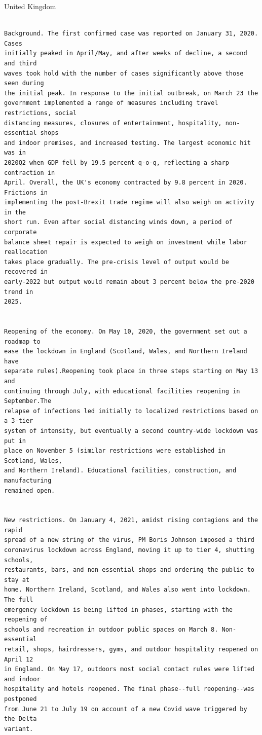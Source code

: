 \documentclass[10pt, letterpaper]{article}
\begin{document}
\begin{spacing}{1.4}
United Kingdom
\begin{scriptsize}
\begin{spacing}{.85}
\begin{verbatim}

Background. The first confirmed case was reported on January 31, 2020. Cases
initially peaked in April/May, and after weeks of decline, a second and third
waves took hold with the number of cases significantly above those seen during
the initial peak. In response to the initial outbreak, on March 23 the
government implemented a range of measures including travel restrictions, social
distancing measures, closures of entertainment, hospitality, non-essential shops
and indoor premises, and increased testing. The largest economic hit was in
2020Q2 when GDP fell by 19.5 percent q-o-q, reflecting a sharp contraction in
April. Overall, the UK's economy contracted by 9.8 percent in 2020. Frictions in
implementing the post-Brexit trade regime will also weigh on activity in the
short run. Even after social distancing winds down, a period of corporate
balance sheet repair is expected to weigh on investment while labor reallocation
takes place gradually. The pre-crisis level of output would be recovered in
early-2022 but output would remain about 3 percent below the pre-2020 trend in
2025.


Reopening of the economy. On May 10, 2020, the government set out a roadmap to
ease the lockdown in England (Scotland, Wales, and Northern Ireland have
separate rules).Reopening took place in three steps starting on May 13 and
continuing through July, with educational facilities reopening in September.The
relapse of infections led initially to localized restrictions based on a 3-tier
system of intensity, but eventually a second country-wide lockdown was put in
place on November 5 (similar restrictions were established in Scotland, Wales,
and Northern Ireland). Educational facilities, construction, and manufacturing
remained open.


New restrictions. On January 4, 2021, amidst rising contagions and the rapid
spread of a new string of the virus, PM Boris Johnson imposed a third
coronavirus lockdown across England, moving it up to tier 4, shutting schools,
restaurants, bars, and non-essential shops and ordering the public to stay at
home. Northern Ireland, Scotland, and Wales also went into lockdown. The full
emergency lockdown is being lifted in phases, starting with the reopening of
schools and recreation in outdoor public spaces on March 8. Non-essential
retail, shops, hairdressers, gyms, and outdoor hospitality reopened on April 12
in England. On May 17, outdoors most social contact rules were lifted and indoor
hospitality and hotels reopened. The final phase--full reopening--was postponed
from June 21 to July 19 on account of a new Covid wave triggered by the Delta
variant.




\end{verbatim}
\end{spacing}
\end{scriptsize}
\end{spacing}
\end{document}
